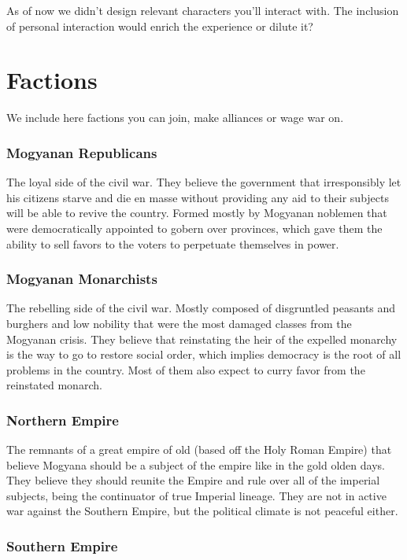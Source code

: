 \documentclass[a4paper, 11pt]{article}
\begin{document}
As of now we didn't design relevant characters you'll interact with. The inclusion of personal interaction would enrich the experience or dilute it?

\section*{Factions}

We include here factions you can join, make alliances or wage war on.

\subsubsection*{Mogyanan Republicans}

The loyal side of the civil war. They believe the government that irresponsibly let his citizens starve and die en masse without providing any aid to their subjects will be able to revive the country. Formed mostly by Mogyanan noblemen that were democratically appointed to gobern over provinces, which gave them the ability to sell favors to the voters to perpetuate themselves in power.

\subsubsection*{Mogyanan Monarchists}

The rebelling side of the civil war. Mostly composed of disgruntled peasants and burghers and low nobility that were the most damaged classes from the Mogyanan crisis. They believe that reinstating the heir of the expelled monarchy is the way to go to restore social order, which implies democracy is the root of all problems in the country. Most of them also expect to curry favor from the reinstated monarch.

\subsubsection*{Northern Empire}

The remnants of a great empire of old (based off the Holy Roman Empire) that believe Mogyana should be a subject of the empire like in the gold olden days. They believe they should reunite the Empire and rule over all of the imperial subjects, being the continuator of true Imperial lineage. They are not in active war against the Southern Empire, but the political climate is not peaceful either.

\subsubsection*{Southern Empire}
\end{document}
